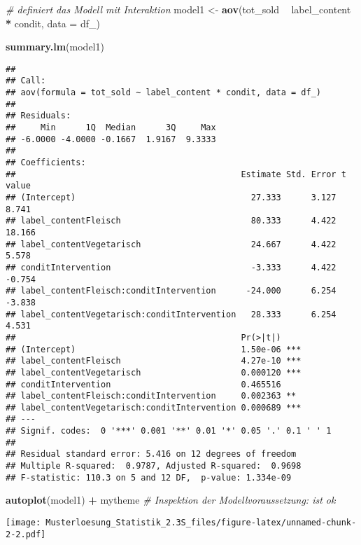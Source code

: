 \documentclass[]{article}
\newenvironment{Shaded}{\begin{snugshade}}{\end{snugshade}}
\newcommand{\KeywordTok}[1]{\textcolor[rgb]{0.13,0.29,0.53}{\textbf{#1}}}
\newcommand{\DataTypeTok}[1]{\textcolor[rgb]{0.13,0.29,0.53}{#1}}
\newcommand{\StringTok}[1]{\textcolor[rgb]{0.31,0.60,0.02}{#1}}
\newcommand{\CommentTok}[1]{\textcolor[rgb]{0.56,0.35,0.01}{\textit{#1}}}
\newcommand{\OperatorTok}[1]{\textcolor[rgb]{0.81,0.36,0.00}{\textbf{#1}}}
\newcommand{\NormalTok}[1]{#1}
\begin{document}
\begin{Shaded}
\begin{Highlighting}[]
\CommentTok{# definiert das Modell mit Interaktion}
\NormalTok{model1 <-}\StringTok{ }\KeywordTok{aov}\NormalTok{(tot_sold }\OperatorTok{~}\StringTok{ }\NormalTok{label_content }\OperatorTok{*}\StringTok{ }\NormalTok{condit, }\DataTypeTok{data =}\NormalTok{ df_)}

\KeywordTok{summary.lm}\NormalTok{(model1)}
\end{Highlighting}
\end{Shaded}

\begin{verbatim}
## 
## Call:
## aov(formula = tot_sold ~ label_content * condit, data = df_)
## 
## Residuals:
##     Min      1Q  Median      3Q     Max 
## -6.0000 -4.0000 -0.1667  1.9167  9.3333 
## 
## Coefficients:
##                                             Estimate Std. Error t value
## (Intercept)                                   27.333      3.127   8.741
## label_contentFleisch                          80.333      4.422  18.166
## label_contentVegetarisch                      24.667      4.422   5.578
## conditIntervention                            -3.333      4.422  -0.754
## label_contentFleisch:conditIntervention      -24.000      6.254  -3.838
## label_contentVegetarisch:conditIntervention   28.333      6.254   4.531
##                                             Pr(>|t|)    
## (Intercept)                                 1.50e-06 ***
## label_contentFleisch                        4.27e-10 ***
## label_contentVegetarisch                    0.000120 ***
## conditIntervention                          0.465516    
## label_contentFleisch:conditIntervention     0.002363 ** 
## label_contentVegetarisch:conditIntervention 0.000689 ***
## ---
## Signif. codes:  0 '***' 0.001 '**' 0.01 '*' 0.05 '.' 0.1 ' ' 1
## 
## Residual standard error: 5.416 on 12 degrees of freedom
## Multiple R-squared:  0.9787, Adjusted R-squared:  0.9698 
## F-statistic: 110.3 on 5 and 12 DF,  p-value: 1.334e-09
\end{verbatim}

\begin{Shaded}
\begin{Highlighting}[]
\KeywordTok{autoplot}\NormalTok{(model1) }\OperatorTok{+}\StringTok{ }\NormalTok{mytheme  }\CommentTok{# Inspektion der Modellvoraussetzung: ist ok}
\end{Highlighting}
\end{Shaded}

\texttt{[image: Musterloesung\_Statistik\_2.3S\_files/figure-latex/unnamed-chunk-2-2.pdf]}
\end{document}

